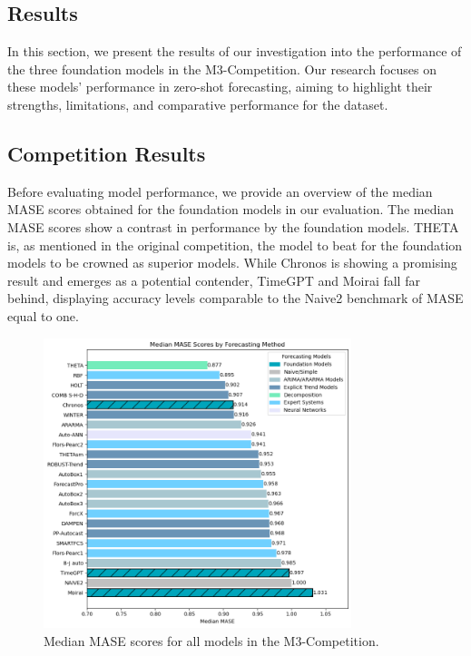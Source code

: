 \documentclass[12pt,a4paper]{article}
\begin{document}
\begin{center}
  \section{Results}
\end{center}

In this section, we present the results of our investigation into the performance of the three foundation models in the M3-Competition. Our research focuses on these models' performance in zero-shot forecasting, aiming to highlight their strengths, limitations, and comparative performance for the dataset. 

\subsection{Competition Results}

Before evaluating model performance, we provide an overview of the median MASE scores obtained for the foundation models in our evaluation. The median MASE scores show a contrast in performance by the foundation models. THETA is, as mentioned in the original competition, the model to beat for the foundation models to be crowned as superior models. While Chronos is showing a promising result and emerges as a potential contender, TimeGPT and Moirai fall far behind, displaying accuracy levels comparable to the Naive2 benchmark of MASE equal to one. 

\begin{figure}[htbp]
  \centering
  \includegraphics[width=0.8\textwidth]{median_mase_overall.png}
  \caption{Median MASE scores for all models in the M3-Competition.}
  \label{median_mase_scores}
\end{figure}
\end{document}
